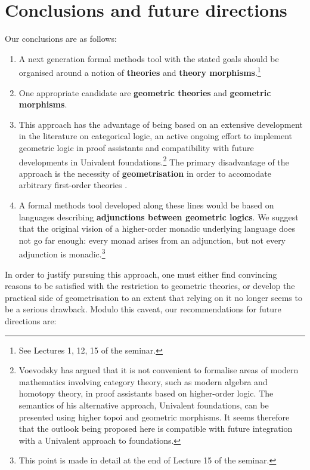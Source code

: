 \documentclass[english,letter paper,12pt,reqno]{article}
\theoremstyle{example}
\begin{document}
\section{Conclusions and future directions}

Our conclusions are as follows:

\begin{enumerate}
\item A next generation formal methods tool with the stated goals should be organised around a notion of \textbf{theories} and \textbf{theory morphisms}.\footnote{See Lectures 1, 12, 15 of the seminar.}

\item One appropriate candidate are \textbf{geometric theories} and \textbf{geometric morphisms}. 

\item This approach has the advantage of being based on an extensive development in the literature on categorical logic, an active ongoing effort to implement geometric logic in proof assistants \cite{bezem2} and compatibility with future developments in Univalent foundations.\footnote{Voevodsky has argued that it is not convenient to formalise areas of modern mathematics involving category theory, such as modern algebra and homotopy theory, in proof assistants based on higher-order logic. The semantics of his alternative approach, Univalent foundations, can be presented using higher topoi and geometric morphisms. It seems therefore that the outlook being proposed here is compatible with future integration with a Univalent approach to foundations.} The primary disadvantage of the approach is the necessity of \textbf{geometrisation} in order to accomodate arbitrary first-order theories \cite{negri}.

\item A formal methods tool developed along these lines would be based on languages describing \textbf{adjunctions between geometric logics}. We suggest that the original vision of a higher-order monadic underlying language does not go far enough: every monad arises from an adjunction, but not every adjunction is monadic.\footnote{This point is made in detail at the end of Lecture 15 of the seminar.}
\end{enumerate}

In order to justify pursuing this approach, one must either find convincing reasons to be satisfied with the restriction to geometric theories, or develop the practical side of geometrisation to an extent that relying on it no longer seems to be a serious drawback. Modulo this caveat, our recommendations for future directions are:
\end{document}
